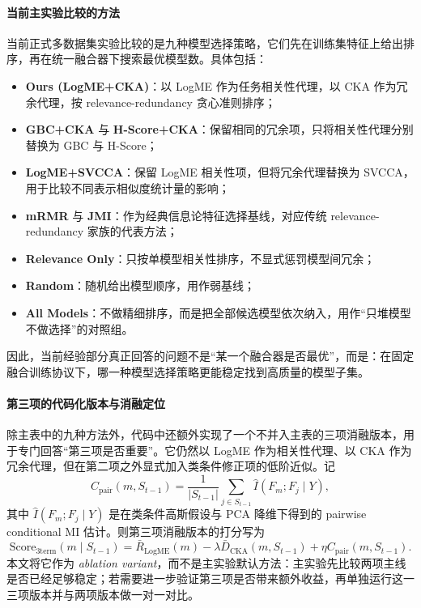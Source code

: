 \documentclass[UTF8,fontset=fandol]{ctexart}
\theoremstyle{remark}
\begin{document}
\paragraph{当前主实验比较的方法}
当前正式多数据集实验比较的是九种模型选择策略，它们先在训练集特征上给出排序，再在统一融合器下搜索最优模型数。具体包括：
\begin{itemize}
    \item \textbf{Ours (LogME+CKA)}：以 LogME 作为任务相关性代理，以 CKA 作为冗余代理，按 relevance-redundancy 贪心准则排序；
    \item \textbf{GBC+CKA} 与 \textbf{H-Score+CKA}：保留相同的冗余项，只将相关性代理分别替换为 GBC 与 H-Score；
    \item \textbf{LogME+SVCCA}：保留 LogME 相关性项，但将冗余代理替换为 SVCCA，用于比较不同表示相似度统计量的影响；
    \item \textbf{mRMR} 与 \textbf{JMI}：作为经典信息论特征选择基线，对应传统 relevance-redundancy 家族的代表方法；
    \item \textbf{Relevance Only}：只按单模型相关性排序，不显式惩罚模型间冗余；
    \item \textbf{Random}：随机给出模型顺序，用作弱基线；
    \item \textbf{All Models}：不做精细排序，而是把全部候选模型依次纳入，用作“只堆模型不做选择”的对照组。
\end{itemize}
因此，当前经验部分真正回答的问题不是“某一个融合器是否最优”，而是：在固定融合训练协议下，哪一种模型选择策略更能稳定找到高质量的模型子集。

\paragraph{第三项的代码化版本与消融定位}
除主表中的九种方法外，代码中还额外实现了一个不并入主表的三项消融版本，用于专门回答“第三项是否重要”。它仍然以 LogME 作为相关性代理、以 CKA 作为冗余代理，但在第二项之外显式加入类条件修正项的低阶近似。记
\[
C_{\mathrm{pair}}(m, S_{t-1})
= \frac{1}{|S_{t-1}|}\sum_{j \in S_{t-1}} \widehat I(F_m; F_j \mid Y),
\]
其中 $\widehat I(F_m; F_j \mid Y)$ 是在类条件高斯假设与 PCA 降维下得到的 pairwise conditional MI 估计。则第三项消融版本的打分写为
\[
\mathrm{Score}_{\mathrm{3term}}(m \mid S_{t-1})
= \bar R_{\mathrm{LogME}}(m)
- \lambda \bar D_{\mathrm{CKA}}(m, S_{t-1})
+ \eta C_{\mathrm{pair}}(m, S_{t-1}).
\]
本文将它作为 \emph{ablation variant}，而不是主实验默认方法：主实验先比较两项主线是否已经足够稳定；若需要进一步验证第三项是否带来额外收益，再单独运行这一三项版本并与两项版本做一对一对比。
\end{document}
